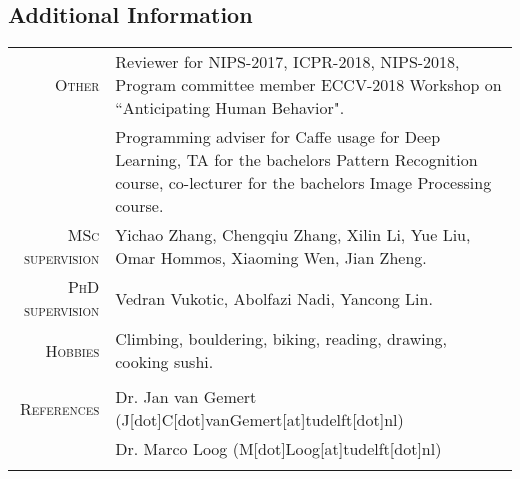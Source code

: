 \documentclass[a4paper, oneside, final]{scrartcl}
\begin{document}
\begin{center}
		\section{Additional Information}
		\begin{tabular}{r@{\hskip 0.3in}p{11.3cm}}
			\textsc{Other}			 & Reviewer for NIPS-2017, ICPR-2018, NIPS-2018, Program committee member ECCV-2018 Workshop on ``Anticipating Human Behavior".\\
									 & Programming adviser for Caffe usage for Deep Learning, TA for the bachelors Pattern Recognition course, co-lecturer for the bachelors Image Processing course.\\
			\textsc{MSc supervision} & Yichao Zhang, Chengqiu Zhang, Xilin Li, Yue Liu, Omar Hommos, Xiaoming Wen, Jian Zheng.\\
			\textsc{PhD supervision} & Vedran Vukotic, Abolfazi Nadi, Yancong Lin.\\[5px] 
			\textsc{Hobbies}		 & Climbing, bouldering, biking, reading, drawing, cooking sushi.\\					 
			\multicolumn{2}{c}{}\\

			\textsc{References} & Dr. Jan van Gemert (J[dot]C[dot]vanGemert[at]tudelft[dot]nl)\\
                                & Dr. Marco Loog (M[dot]Loog[at]tudelft[dot]nl)\\[5px]
			\multicolumn{2}{c}{}\\
		\end{tabular}
	\end{center}
\end{document}
